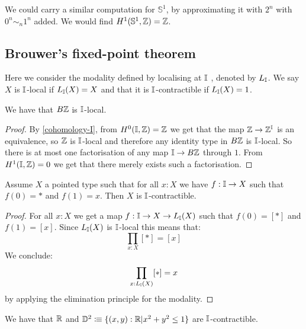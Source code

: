 \begin{remark}
We could carry a similar computation for $\mathbb{S}^1$, by approximating it with $2^n$ with $0^n\sim_n1^n$ added. We would find $H^1(\mathbb{S}^1,\mathbb{Z})=\mathbb{Z}$.
\end{remark}


\subsection{Brouwer's fixed-point theorem}

Here we consider the modality defined by localising at $\mathbb{I}$ \cite{modalities}, denoted by $L_{\mathbb{I}}$. We say $X$ is $\mathbb{I}$-local if $L_{\mathbb{I}}(X) = X$ and that it is $\mathbb{I}$-contractible if $L_{\mathbb{I}}(X)=1$.

\begin{lemma}\label{BZ-I-local}
We have that $B\mathbb{Z}$ is $\mathbb{I}$-local.
\end{lemma}

\begin{proof}
By \cref{cohomology-I}, from $H^0(\mathbb{I},\mathbb{Z})=\mathbb{Z}$ we get that the map $\mathbb{Z}\to \mathbb{Z}^{\mathbb{I}}$ is an equivalence, so $\mathbb{Z}$ is $\mathbb{I}$-local and therefore any identity type in $B\mathbb{Z}$ is $\mathbb{I}$-local. So there is at most one factorisation of any map $\mathbb{I}\to B\mathbb{Z}$ through $1$. From $H^1(\mathbb{I},\mathbb{Z})=0$ we get that there merely exists such a factorisation.
\end{proof}

\begin{lemma}\label{continuously-path-connected-contractible}
Assume $X$ a pointed type such that for all $x:X$ we have $f:\mathbb{I}\to X$ such that $f(0)=*$ and $f(1)=x$. Then $X$ is $\mathbb{I}$-contractible.
\end{lemma}

\begin{proof}
For all $x:X$ we get a map $f:\mathbb{I}\to X\to L_{\mathbb{I}}(X)$ such that $f(0) = [*]$ and $f(1)=[x]$. Since $L_{\mathbb{I}}(X)$ is $\mathbb{I}$-local this means that:
\[\prod_{x:X}[*]=[x]\]
We conclude:
\[\prod_{x:L_{\mathbb{I}}(X)}[*]=x\]
by applying the elimination principle for the modality.
\end{proof}

\begin{corollary}\label{R-I-contractible}
We have that $\mathbb{R}$ and $\mathbb{D}^2\vcentcolon\mspace{-1.2mu}\equiv\{(x,y):\mathbb R\vert x^2+y^2\leq 1\}$ are $\mathbb{I}$-contractible.
\end{corollary}

